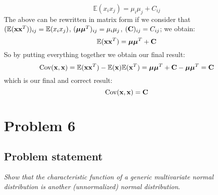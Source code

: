 \documentclass[a4paper]{article}
\newcommand{\mat}[1]{\vb{#1}}
\begin{document}
\begin{equation*}
    \mathbb{E}(x_i x_j) = \mu_i\mu_j + C_{ij}
\end{equation*}
The above can be rewritten in matrix form if we consider that $(\mathbb{E}(\vb{x}\vb{x}^T))_{ij} = \mathbb{E}(x_i x_j)$, $(\vb*{\mu}\vb*{\mu}^T)_{ij} = \mu_i\mu_j$, $(\mat{C})_{ij} =C_{ij}$; we obtain:
\begin{equation*}
    \mathbb{E}(\vb{x}\vb{x}^T) = \vb*{\mu}\vb*{\mu}^T + \mat{C}
\end{equation*}
So by putting everything together we obtain our final result:
\begin{equation*}
    \text{Cov}(\vb{x},\vb{x}) =
    \mathbb{E}(\vb{x}\vb{x}^T) - \mathbb{E}(\vb{x})\mathbb{E}(\vb{x}^T) =
    \vb*{\mu}\vb*{\mu}^T + \mat{C} - \vb*{\mu}\vb*{\mu}^T = \mat{C} 
\end{equation*}
which is our final and correct result:
\begin{equation*}
    \text{Cov}(\vb{x},\vb{x}) = \mat{C}
\end{equation*}

\section{Problem 6}
\subsection{Problem statement}
\textit{Show that the characteristic function of a generic multivariate normal distribution is another (unnormalized) normal distribution}.
\end{document}
